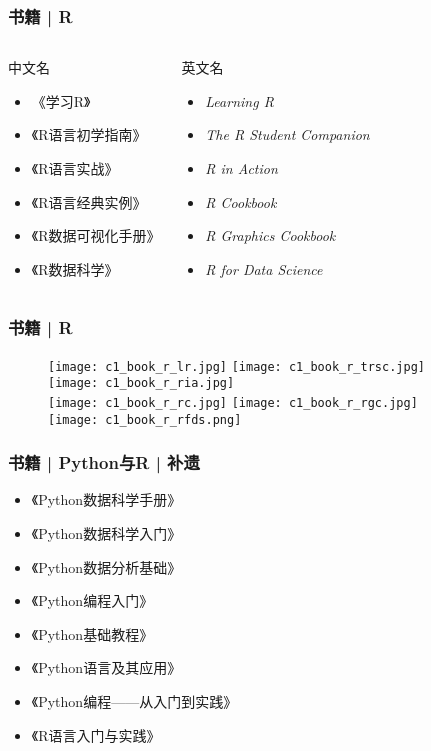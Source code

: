 \begin{frame}
  \frametitle{书籍 | R}
  \begin{columns}
  \begin{block}{中文名}
    \begin{itemize}
      \item 《学习R》
      \item 《R语言初学指南》
      \item 《R语言实战》
      \item 《R语言经典实例》
      \item 《R数据可视化手册》
      \item 《R数据科学》
    \end{itemize}
  \end{block}
  \begin{block}{英文名}
    \begin{itemize}
      \item \textit{Learning R}
      \item \textit{The R Student Companion}
      \item \textit{R in Action}
      \item \textit{R Cookbook}
      \item \textit{R Graphics Cookbook}
      \item \textit{R for Data Science}
    \end{itemize}
  \end{block}
\end{columns}
\end{frame}

\begin{frame}
  \frametitle{书籍 | R}
  \begin{figure}
    \centering
    \texttt{[image: c1\_book\_r\_lr.jpg]}\qquad
    \texttt{[image: c1\_book\_r\_trsc.jpg]}\qquad
    \texttt{[image: c1\_book\_r\_ria.jpg]}\\
    \texttt{[image: c1\_book\_r\_rc.jpg]}\qquad
    \texttt{[image: c1\_book\_r\_rgc.jpg]}\qquad
    \texttt{[image: c1\_book\_r\_rfds.png]}\\
  \end{figure}
\end{frame}

\begin{frame}
  \frametitle{书籍 | Python与R | 补遗}
  \begin{itemize}
    \item 《Python数据科学手册》
    \item 《Python数据科学入门》
    \item 《Python数据分析基础》
    \item 《Python编程入门》
    \item 《Python基础教程》
    \item 《Python语言及其应用》
    \item 《Python编程——从入门到实践》
    \item 《R语言入门与实践》
  \end{itemize}
\end{frame}

